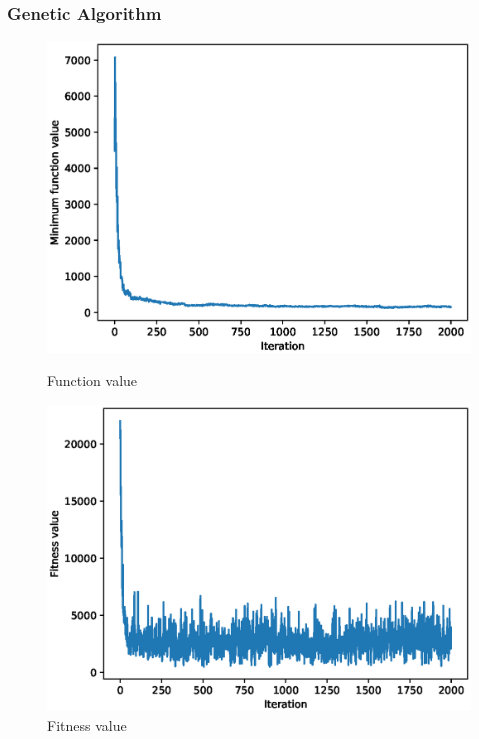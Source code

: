 \documentclass{article}
\begin{document}
\subsubsection{Genetic Algorithm}
\begin{figure}[!htbp]
	\centering
	\begin{minipage}{.48\textwidth}
		\centering
		\includegraphics[scale=.4]{experiment_1a_rosenbrock/min_eval_0.eps}
		\caption{Function value}
	\end{minipage}\hfill
	\begin{minipage}{.48\textwidth}
		\centering
		\includegraphics[scale=.4]{experiment_1a_rosenbrock/max_fitness_0.eps}
		\caption{Fitness value}
	\end{minipage}
\end{figure}
\FloatBarrier
\end{document}
